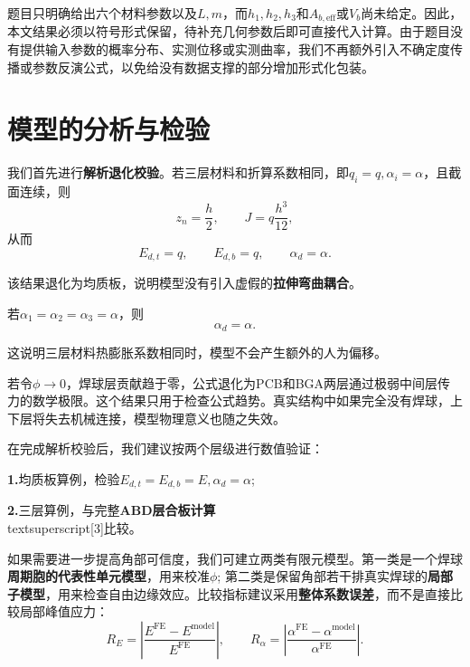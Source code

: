 \documentclass[draft,12pt,a4paper]{ctexart}
\theoremstyle{definition}
\begin{document}
题目只明确给出六个材料参数以及$L,m$，而$h_1,h_2,h_3$和$A_{b,\mathrm{eff}}$或$V_b$尚未给定。因此，本文结果必须以符号形式保留，待补充几何参数后即可直接代入计算。由于题目没有提供输入参数的概率分布、实测位移或实测曲率，我们不再额外引入不确定度传播或参数反演公式，以免给没有数据支撑的部分增加形式化包装。

\newpage
\section{模型的分析与检验}

我们首先进行\textbf{解析退化校验}。若三层材料和折算系数相同，即$q_i=q,\alpha_i=\alpha$，且截面连续，则
\begin{equation}
z_n=\frac{h}{2},\qquad J=q\frac{h^3}{12},
\end{equation}
从而
\begin{equation}
E_{d,t}=q,\qquad E_{d,b}=q,\qquad \alpha_d=\alpha.
\end{equation}

该结果退化为均质板，说明模型没有引入虚假的\textbf{拉伸弯曲耦合}。

若$\alpha_1=\alpha_2=\alpha_3=\alpha$，则
\begin{equation}
\alpha_d=\alpha.
\end{equation}

这说明三层材料热膨胀系数相同时，模型不会产生额外的人为偏移。

若令$\phi \to 0$，焊球层贡献趋于零，公式退化为PCB和BGA两层通过极弱中间层传力的数学极限。这个结果只用于检查公式趋势。真实结构中如果完全没有焊球，上下层将失去机械连接，模型物理意义也随之失效。

在完成解析校验后，我们建议按两个层级进行数值验证：

\textbf{1.}均质板算例，检验$E_{d,t}=E_{d,b}=E,\alpha_d=\alpha$;

\textbf{2.}三层算例，与完整\textbf{ABD层合板计算}\\textsuperscript{[3]}比较。

如果需要进一步提高角部可信度，我们可建立两类有限元模型。第一类是一个焊球\textbf{周期胞的代表性单元模型}，用来校准$\phi$; 第二类是保留角部若干排真实焊球的\textbf{局部子模型}，用来检查自由边缘效应。比较指标建议采用\textbf{整体系数误差}，而不是直接比较局部峰值应力：
\begin{equation}
R_E=\left|\frac{E^{\mathrm{FE}}-E^{\mathrm{model}}}{E^{\mathrm{FE}}}\right|,
\qquad
R_\alpha=\left|\frac{\alpha^{\mathrm{FE}}-\alpha^{\mathrm{model}}}{\alpha^{\mathrm{FE}}}\right|.
\end{equation}
\end{document}
